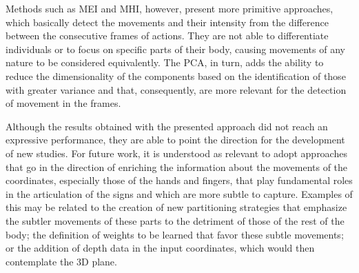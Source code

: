 Methods such as MEI and MHI, however, present more primitive approaches, which basically detect the movements and their intensity from the difference between the consecutive frames of actions. They are not able to differentiate individuals or to focus on specific parts of their body, causing movements of any nature to be considered equivalently. The PCA, in turn, adds the ability to reduce the dimensionality of the components based on the identification of those with greater variance and that, consequently, are more relevant for the detection of movement in the frames.

Although the results obtained with the presented approach did not reach an expressive performance, they are able to point the direction for the development of new studies. %
For future work, it is understood as relevant to adopt approaches that go in the direction of enriching the information about the movements of the coordinates, especially those of the hands and fingers, that play  fundamental roles in the articulation of the signs and which are more subtle to capture. Examples of this may be related to the creation of new partitioning strategies that emphasize the subtler movements of these parts to the detriment of those of the rest of the body; the definition of weights to be learned that favor these subtle movements; or the addition of depth data in the input coordinates, which would then contemplate the 3D plane.





